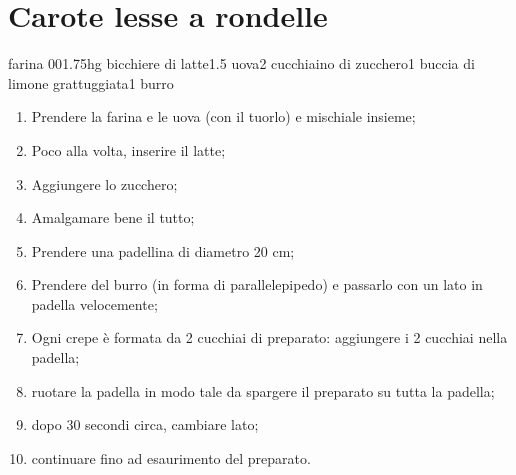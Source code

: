 \section{Carote lesse a rondelle}

\generalRecipeInfos{}

\ingredienti%
    {farina 00}{1.75hg}%
    {bicchiere di latte}{1.5}%
    {uova}{2}%
    {cucchiaino di zucchero}{1}%
    {buccia di limone grattuggiata}{1}%
    {burro}{\qb{}}


\begin{enumerate}
    \item Prendere la farina e le uova (con il tuorlo) e mischiale insieme;
    \item Poco alla volta, inserire il latte;
    \item Aggiungere lo zucchero;
    \item Amalgamare bene il tutto;
    \item Prendere una padellina di diametro 20 cm;
    \item Prendere del burro (in forma di parallelepipedo) e passarlo con un lato in padella velocemente;
    \item Ogni crepe è formata da 2 cucchiai di preparato: aggiungere i 2 cucchiai nella padella;
    \item ruotare la padella in modo tale da spargere il preparato su tutta la padella;
    \item dopo 30 secondi circa, cambiare lato;
    \item continuare fino ad esaurimento del preparato.
    
\end{enumerate}
